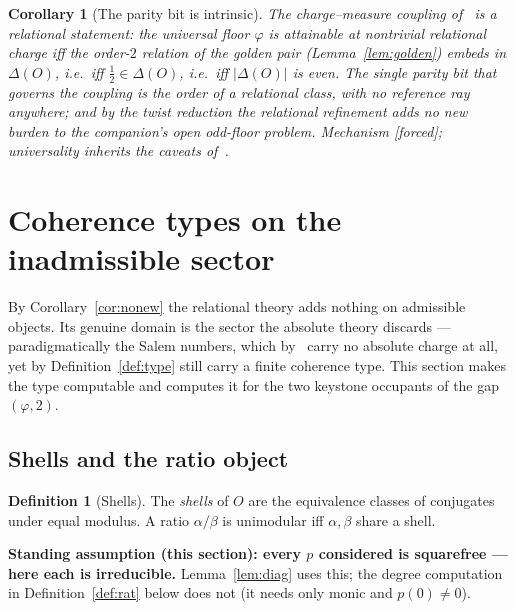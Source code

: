 \documentclass[11pt]{article}
\theoremstyle{plain}
\newtheorem{corollary}[theorem]{Corollary}
\theoremstyle{definition}
\newtheorem{definition}[theorem]{Definition}
\theoremstyle{remark}
\newcommand{\F}{\textnormal{[forced]}}
\begin{document}
\begin{corollary}[The parity bit is intrinsic]\label{cor:paritybit}
The charge--measure coupling of~\cite[Thm.~5.1, Cor.~6.3]{CMC} is a relational
statement: the universal floor $\varphi$ is attainable at nontrivial relational
charge iff the order-$2$ relation of the golden pair
(Lemma~\ref{lem:golden}) embeds in $\Delta(O)$, i.e.\ iff $\tfrac12\in\Delta(O)$,
i.e.\ iff $|\Delta(O)|$ is even. The single parity bit that governs the coupling
is the order of a \emph{relational} class, with no reference ray anywhere; and by
the twist reduction the relational refinement adds no new burden to the
companion's open odd-floor problem. Mechanism \F; universality inherits the
caveats of~\cite[Thm.~5.1, Thm.~6.2]{CMC}.
\end{corollary}

\section{Coherence types on the inadmissible sector}\label{sec:inert}

By Corollary~\ref{cor:nonew} the relational theory adds nothing on admissible
objects. Its genuine domain is the sector the absolute theory discards ---
paradigmatically the Salem numbers, which by~\cite[Lem.~6.1]{CMC} carry no
absolute charge at all, yet by Definition~\ref{def:type} still carry a finite
coherence type. This section makes the type computable and computes it for the
two keystone occupants of the gap $(\varphi,2)$.

\subsection{Shells and the ratio object}

\begin{definition}[Shells]
The \emph{shells} of $O$ are the equivalence classes of conjugates under equal
modulus. A ratio $\alpha/\beta$ is unimodular iff $\alpha,\beta$ share a shell.
\end{definition}

\medskip
\noindent\textbf{Standing assumption (this section): every $p$ considered
is squarefree --- here each is irreducible.} Lemma~\ref{lem:diag} uses this;
the degree computation in Definition~\ref{def:rat} below does not (it needs
only monic and $p(0)\neq0$).
\end{document}
